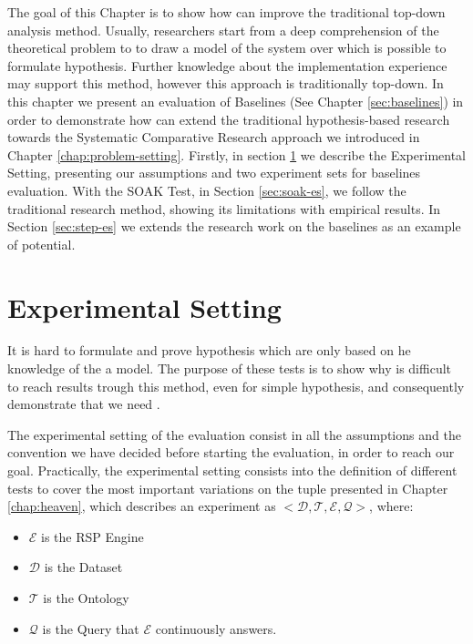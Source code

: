 The goal of this Chapter is to show how \name can improve the traditional top-down analysis method. Usually, researchers start from a deep comprehension of the theoretical problem  to to draw a model of the system over which is possible to formulate hypothesis. Further knowledge about  the implementation experience may support this method, however this approach is traditionally top-down. In this chapter we present an evaluation of \name Baselines (See Chapter \ref{sec:baselines}) in order to demonstrate how \name can extend the traditional hypothesis-based research towards the Systematic Comparative Research approach we introduced in Chapter \ref{chap:problem-setting}. Firstly, in section \ref{sec:experimental-setting} we describe the Experimental Setting, presenting our assumptions and two experiment sets for baselines evaluation. With the SOAK Test, in Section \ref{sec:soak-es}, we follow the traditional research method, showing its limitations with empirical results. In Section \ref{sec:step-es} we extends the research work on the baselines as an example of \name potential.

\section{Experimental Setting}
\label{sec:experimental-setting}

It is hard to formulate and prove hypothesis which are only based on he knowledge of the a model. The purpose of these tests is to show why is difficult to reach results trough this method, even for simple hypothesis, and consequently demonstrate that we need \namens .

The experimental setting of the evaluation consist in all the assumptions and the convention we have decided before starting the evaluation, in order to reach our goal. Practically, the experimental setting  consists into the definition of different tests to cover the most important variations on the tuple presented in Chapter \ref{chap:heaven}, which describes an experiment as $<\mathcal{D}, \mathcal{T},\mathcal{E}, \mathcal{Q}>$, where:
\begin{itemize}
\item $\mathcal{E}$ is the RSP Engine
\item $\mathcal{D}$ is the Dataset 
\item $\mathcal{T}$ is the Ontology
\item $\mathcal{Q}$ is the Query that $\mathcal{E}$ continuously answers.
\end{itemize}



